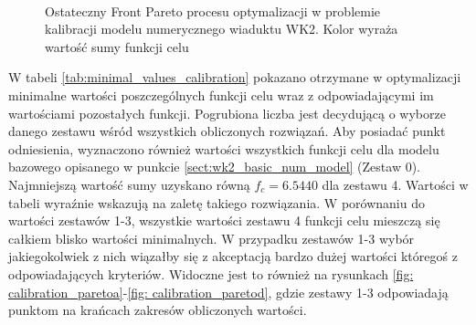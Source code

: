 \begin{figure}[hbt!]
	\centering
	 \\
	\captionsetup{justification=centering}
	\caption{Ostateczny Front Pareto procesu optymalizacji w problemie kalibracji modelu numerycznego wiaduktu WK2. Kolor wyraża wartość sumy funkcji celu}
	\label{fig: calibration_pareto}
\end{figure}

W tabeli \ref{tab:minimal_values_calibration} pokazano otrzymane w optymalizacji minimalne wartości poszczególnych funkcji celu wraz z odpowiadającymi im wartościami pozostałych funkcji. Pogrubiona liczba jest decydującą o wyborze danego zestawu wśród wszystkich obliczonych rozwiązań. Aby posiadać punkt odniesienia, wyznaczono również wartości wszystkich funkcji celu dla modelu bazowego opisanego w punkcie \ref{sect:wk2_basic_num_model} (Zestaw 0). Najmniejszą wartość sumy uzyskano równą $f_c=6.5440$ dla zestawu 4. Wartości w tabeli wyraźnie wskazują na zaletę takiego rozwiązania. W porównaniu do wartości zestawów 1-3, wszystkie wartości zestawu 4 funkcji celu mieszczą się całkiem blisko wartości minimalnych. W przypadku zestawów 1-3 wybór jakiegokolwiek z nich wiązałby się z akceptacją bardzo dużej wartości któregoś z odpowiadających kryteriów. Widoczne jest to również na rysunkach \ref{fig: calibration_paretoa}-\ref{fig: calibration_paretod}, gdzie zestawy 1-3 odpowiadają punktom na krańcach zakresów obliczonych wartości. %

